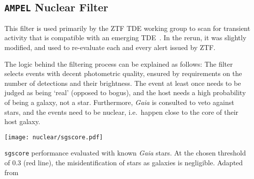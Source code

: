 \subsection{\texttt{AMPEL} Nuclear Filter}\label{nuclear_filter}

This filter is used primarily by the ZTF TDE working group to scan for transient activity that is compatible with an emerging TDE~\cite{Velzen2021a}. In the rerun, it was slightly modified, and used to re-evaluate each and every alert issued by ZTF.

The logic behind the filtering process can be explained as follows: The filter selects events with decent photometric quality, ensured by requirements on the number of detections and their brightness. The event at least once needs to be judged as being `real' (opposed to bogus), and the host needs a high probability of being a galaxy, not a star. Furthermore, \textit{Gaia} is consulted to veto against stars, and the events need to be nuclear, i.e.~happen close to the core of their host galaxy.

\begin{marginfigure}
  \texttt{[image: nuclear/sgscore.pdf]}
  \caption[\texttt{sgscore} performance]{\texttt{sgscore} performance evaluated with known \textit{Gaia} stars. At the chosen threshold of 0.3 (red line), the misidentification of stars as galaxies is negligible. Adapted from~\cite{Tachibana2018}}
\end{marginfigure}

